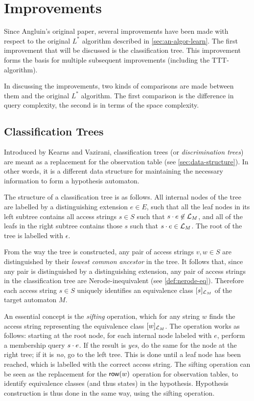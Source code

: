 \documentclass[multi,crop=false,class=article]{standalone}
\begin{document}
\section{Improvements}
\label{sec:improvements}
Since Angluin's original paper, several improvements have been made with respect
to the original $L^*$ algorithm described in \cref{sec:an-algor-learn}. The
first improvement that will be discussed is the classification tree. This
improvement forms the basis for multiple subsequent improvements (including the
TTT-algorithm).

In discussing the improvements, two kinds of comparisons are made between them
and the original $L^*$ algorithm. The first comparison is the difference in
query complexity, the second is in terms of the space complexity.

\subsection{Classification Trees}
\label{sec:classification-trees}
Introduced by Kearns and Vazirani\cite{Kearns1994}, classification trees (or
\textit{discrimination trees}) are meant as a replacement for the observation
table (see \cref{sec:data-structure}). In other words, it is a different data
structure for maintaining the necessary information to form a hypothesis
automaton.

The structure of a classification tree is as follows. All internal nodes of the
tree are labelled by a distinguishing extension $e \in E$, such that all the
leaf nodes in its left subtree contains all access strings $s \in S$ such that
$s \cdot e \not\in \mathcal{L}_M$, and all of the leafs in the right subtree
contains those $s$ such that $s \cdot e \in \mathcal{L}_M$. The root of the tree is
labelled with $\epsilon$.

From the way the tree is constructed, any pair of access strings $v,w \in S$ are
distinguished by their \textit{lowest common ancestor} in the tree. It follows
that, since any pair is distinguished by a distinguishing extension, any pair of
access strings in the classification tree are Nerode-inequivalent (see
\cref{def:nerode-eq}). Therefore each access string $s \in S$ uniquely
identifies an equivalence class $[s]_{\mathcal{L}_M}$ of the target automaton
$M$.

An essential concept is the \textit{sifting} operation, which for any string $w$
finds the access string representing the equivalence class
$[w]_{\mathcal{L}_M}$. The operation works as follows: starting at the root
node, for each internal node labeled with $e$, perform a membership query
$s \cdot e$. If the result is \textit{yes}, do the same for the node at the
right tree; if it is \textit{no}, go to the left tree. This is done until a leaf
node has been reached, which is labelled with the correct access string. The
sifting operation can be seen as the replacement for the $\mathsf{row}(w)$ operation for
observation tables, to identify equivalence classes (and thus states) in the
hypothesis. Hypothesis construction is thus done in the same way, using the
sifting operation.
\end{document}
